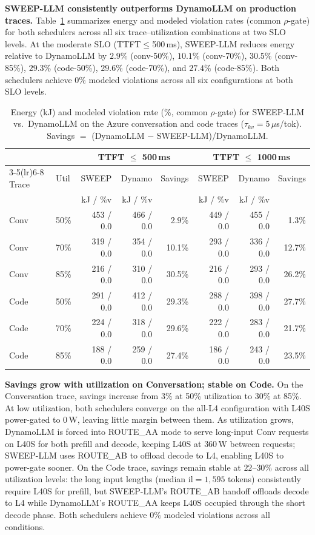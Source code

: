 \label{sec:eval_prod_results}
\textbf{SWEEP-LLM consistently outperforms DynamoLLM on production traces.}
Table~\ref{tab:prod_trace_results} summarizes energy and modeled violation rates (common $\rho$-gate) for both schedulers across all six trace--utilization combinations at two SLO levels.
At the moderate SLO (TTFT$\leq$500\,ms), SWEEP-LLM reduces energy relative to DynamoLLM by $2.9\%$ (conv-50\%), $10.1\%$ (conv-70\%), $30.5\%$ (conv-85\%), $29.3\%$ (code-50\%), $29.6\%$ (code-70\%), and $27.4\%$ (code-85\%).
Both schedulers achieve $0\%$ modeled violations across all six configurations at both SLO levels.

\begin{table}[t]
\centering
\caption{Energy (kJ) and modeled violation rate (\%, common $\rho$-gate) for SWEEP-LLM vs.\ DynamoLLM on the Azure conversation and code traces ($\tau_{kv}{=}5\,\mu$s/tok). Savings $=$ (DynamoLLM $-$ SWEEP-LLM)/DynamoLLM.}
\label{tab:prod_trace_results}
\small
\setlength{\tabcolsep}{4pt}
\begin{tabular}{@{}llrrrrrr@{}}
\toprule
 & & \multicolumn{3}{c}{TTFT $\leq$ 500\,ms} & \multicolumn{3}{c}{TTFT $\leq$ 1000\,ms} \\
\cmidrule(lr){3-5}\cmidrule(lr){6-8}
Trace & Util & SWEEP & Dynamo & Savings & SWEEP & Dynamo & Savings \\
 & & kJ / \%v & kJ / \%v & & kJ / \%v & kJ / \%v & \\
\midrule
Conv & 50\% & 453 / 0.0 & 466 / 0.0 &  2.9\% & 449 / 0.0 & 455 / 0.0 &  1.3\% \\
Conv & 70\% & 319 / 0.0 & 354 / 0.0 & 10.1\% & 293 / 0.0 & 336 / 0.0 & 12.7\% \\
Conv & 85\% & 216 / 0.0 & 310 / 0.0 & 30.5\% & 216 / 0.0 & 293 / 0.0 & 26.2\% \\
\midrule
Code & 50\% & 291 / 0.0 & 412 / 0.0 & 29.3\% & 288 / 0.0 & 398 / 0.0 & 27.7\% \\
Code & 70\% & 224 / 0.0 & 318 / 0.0 & 29.6\% & 222 / 0.0 & 283 / 0.0 & 21.7\% \\
Code & 85\% & 188 / 0.0 & 259 / 0.0 & 27.4\% & 186 / 0.0 & 243 / 0.0 & 23.5\% \\
\bottomrule
\end{tabular}
\end{table}

\textbf{Savings grow with utilization on Conversation; stable on Code.}
On the Conversation trace, savings increase from $3\%$ at 50\% utilization to $30\%$ at 85\%.
At low utilization, both schedulers converge on the all-L4 configuration with L40S power-gated to 0\,W, leaving little margin between them.
As utilization grows, DynamoLLM is forced into ROUTE\_AA mode to serve long-input Conv requests on L40S for both prefill and decode, keeping L40S at $360$\,W between requests; SWEEP-LLM uses ROUTE\_AB to offload decode to L4, enabling L40S to power-gate sooner.
On the Code trace, savings remain stable at $22$--$30\%$ across all utilization levels: the long input lengths (median $\mathrm{il}{=}1{,}595$ tokens) consistently require L40S for prefill, but SWEEP-LLM's ROUTE\_AB handoff offloads decode to L4 while DynamoLLM's ROUTE\_AA keeps L40S occupied through the short decode phase.
Both schedulers achieve $0\%$ modeled violations across all conditions.

